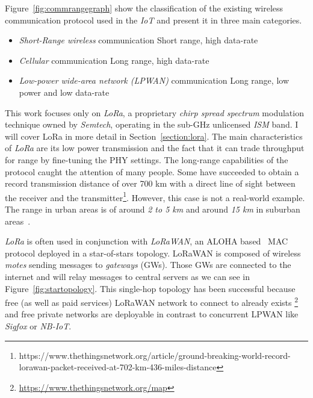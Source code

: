 Figure~\ref{fig:commrangegraph} show the classification
of the existing wireless communication protocol used in the \emph{IoT} and
present it in three main categories.

\begin{itemize}
    \item \emph{Short-Range wireless} communication Short range, high data-rate
    \item \emph{Cellular} communication Long range, high data-rate
    \item \emph{Low-power wide-area network (LPWAN)} communication Long range, low power and low data-rate
\end{itemize}



This work focuses only on \emph{LoRa}, a proprietary \emph{chirp spread spectrum}
modulation technique owned by \emph{Semtech}, operating in the sub-GHz
unlicensed \emph{ISM} band. I will cover LoRa in more detail in 
Section~\ref{section:lora}.
The main characteristics of \emph{LoRa} are its low power transmission and the
fact that it can trade throughput for range by fine-tuning the PHY settings.
The long-range capabilities of the protocol caught the attention of
many people. 
Some have succeeded to obtain a record transmission distance of over 700 km with
a direct line of sight between the receiver and the
transmitter\footnote{https://www.thethingsnetwork.org/article/ground-breaking-world-record-lorawan-packet-received-at-702-km-436-miles-distance}.
However, this case is not a real-world example. The range in urban areas is of
around \emph{2 to 5 km} and around \emph{15 km} in suburban
areas~\cite{8030482}.

\emph{LoRa} is often used in conjunction with \emph{LoRaWAN}, an ALOHA 
based~\cite{loraalliance:lorawanspecification} MAC protocol deployed in a star-of-stars 
topology.
LoRaWAN is composed of wireless \emph{motes} sending messages to \emph{gateways} (GWs).
Those GWs are connected to the internet and will relay messages to central servers
as we can see in Figure~\ref{fig:startopology}.
This single-hop topology has been successful because free (as well as paid
services) LoRaWAN network to connect to already exists
\footnote{\url{https://www.thethingsnetwork.org/map}} and free private networks are
deployable in contrast to concurrent LPWAN like \emph{Sigfox} or \emph{NB-IoT}.

